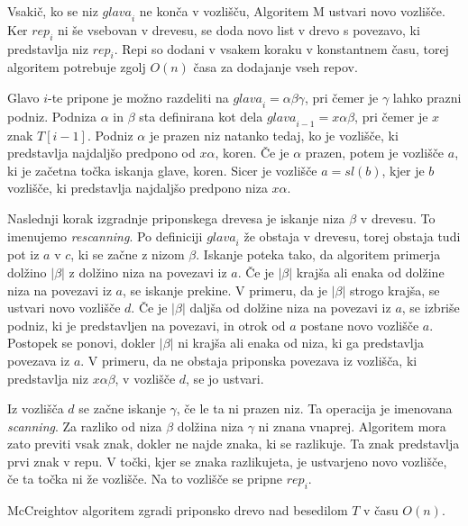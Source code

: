 Vsakič, ko se niz $\textit{glava}_i$ ne konča v vozlišču, Algoritem M ustvari novo vozlišče. Ker $\textit{rep}_i$ ni še vsebovan v drevesu, se doda novo list v drevo s povezavo, ki predstavlja niz $\textit{rep}_i$. Repi so dodani v vsakem koraku v konstantnem času, torej algoritem potrebuje zgolj $O(n)$ časa za dodajanje vseh repov.

Glavo $i$-te pripone je možno razdeliti na $\textit{glava}_i = \alpha\beta\gamma$, pri čemer je $\gamma$ lahko prazni podniz. Podniza $\alpha$ in $ \beta$ sta definirana kot dela $\textit{glava}_{i-1} = x\alpha\beta$, pri čemer je $x$ znak $T[i-1]$. Podniz $\alpha$ je prazen niz natanko tedaj, ko je vozlišče, ki predstavlja najdaljšo predpono od $x\alpha$, koren. Če je $\alpha$ prazen, potem je vozlišče $a$, ki je začetna točka iskanja glave, koren. Sicer je vozlišče $a=\textit{sl}(b)$, kjer je $b$ vozlišče, ki predstavlja najdaljšo predpono niza $x\alpha$.

Naslednji korak izgradnje priponskega drevesa je iskanje niza $\beta$ v drevesu. To imenujemo \textit{rescanning}. Po definiciji $\textit{glava}_i$ že obstaja v drevesu, torej obstaja tudi pot iz $a$ v $c$, ki se začne z nizom $\beta$. Iskanje poteka tako, da algoritem primerja dolžino $|\beta|$ z dolžino niza na povezavi iz $a$. Če je $|\beta|$ krajša ali enaka od dolžine niza na povezavi iz $a$, se iskanje prekine. V primeru, da je $|\beta|$ strogo krajša, se ustvari novo vozlišče $d$. Če je $|\beta|$ daljša od dolžine niza na povezavi iz $a$, se izbriše podniz, ki je predstavljen na povezavi, in otrok od $a$ postane novo vozlišče $a$. Postopek se ponovi, dokler $|\beta|$ ni krajša ali enaka od niza, ki ga predstavlja povezava iz $a$. V primeru, da ne obstaja priponska povezava iz vozlišča, ki predstavlja niz $x\alpha\beta$, v vozlišče $d$, se jo ustvari.

Iz vozlišča $d$ se začne iskanje $\gamma$, če le ta ni prazen niz. Ta operacija je imenovana \textit{scanning}. Za razliko od niza $\beta$ dolžina niza $\gamma$ ni znana vnaprej. Algoritem mora zato previti vsak znak, dokler ne najde znaka, ki se razlikuje. Ta znak predstavlja prvi znak v repu. V točki, kjer se znaka razlikujeta, je ustvarjeno novo vozlišče, če ta točka ni že vozlišče. Na to vozlišče se pripne $\textit{rep}_i$.


\begin{izr}
    McCreightov algoritem zgradi priponsko drevo nad besedilom $T$ v času $O(n)$.
\end{izr}

